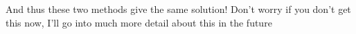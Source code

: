 \documentclass[preview]{standalone}
\begin{document}
\begin{flushleft}
And thus these two methods give the same solution! Don't worry if you don't get this now, I'll go into much more detail about this in the future
\end{flushleft}
\end{document}
